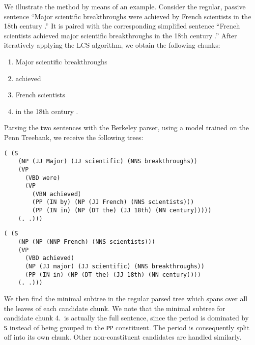 \documentclass[a4paper,11pt]{article}
\begin{document}
We illustrate the method by means of an example. Consider the regular, passive sentence ``Major scientific breakthroughs were achieved by French scientists in the 18th century .''  It is paired with the corresponding simplified sentence ``French scientists achieved major scientific breakthroughs in the 18th century .'' After iteratively applying the LCS algorithm, we obtain the following chunks:

\begin{enumerate}\itemsep 1pt
	\item Major scientific breakthroughs
	\item achieved
	\item French scientists
	\item in the 18th century .
\end{enumerate}

Parsing the two  sentences with the Berkeley parser, using a model trained on the Penn Treebank, we receive the following trees:

\begin{verbatim}
( (S
    (NP (JJ Major) (JJ scientific) (NNS breakthroughs))
    (VP
      (VBD were)
      (VP
        (VBN achieved)
        (PP (IN by) (NP (JJ French) (NNS scientists)))
        (PP (IN in) (NP (DT the) (JJ 18th) (NN century)))))
    (. .)))
\end{verbatim}
\begin{verbatim}
( (S
    (NP (NP (NNP French) (NNS scientists)))
    (VP
      (VBD achieved)
      (NP (JJ major) (JJ scientific) (NNS breakthroughs))
      (PP (IN in) (NP (DT the) (JJ 18th) (NN century))))
    (. .)))
\end{verbatim}



We then find the minimal subtree in the regular parsed tree which spans over all the leaves of each candidate chunk. We note that the minimal subtree for candidate chunk 4.\ is actually the full sentence, since the period is dominated by \texttt{S} instead of being grouped in the \texttt{PP} constituent. The period is consequently split off into its own chunk. Other non-constituent candidates are handled similarly.
\end{document}
